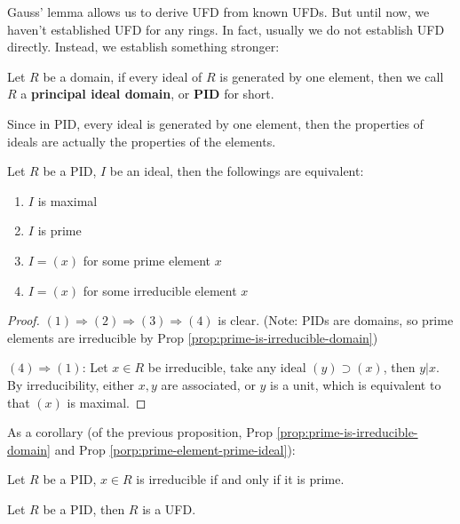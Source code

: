 \documentclass{note-eng}
\begin{document}
Gauss' lemma allows us to derive UFD from known UFDs. But until now, we haven't established UFD for any rings. In fact, usually we do not establish UFD directly. Instead, we establish something stronger:

\begin{definition} 
    Let $R$ be a domain, if every ideal of $R$ is generated by one element, then we call $R$ a \textbf{principal ideal domain}, or \textbf{PID} for short.
\end{definition}

Since in PID, every ideal is generated by one element, then the properties of ideals are actually the properties of the elements.

\begin{proposition} \label{prop:PID-ideals}
    Let $R$ be a PID, $I$ be an ideal, then the followings are equivalent:
    \begin{enumerate}
        \item $I$ is maximal
        \item $I$ is prime
        \item $I = (x)$ for some prime element $x$
        \item $I = (x)$ for some irreducible element $x$
    \end{enumerate}
\end{proposition}

\begin{proof}
    $(1) \Rightarrow (2) \Rightarrow (3) \Rightarrow (4)$ is clear. (Note: PIDs are domains, so prime elements are irreducible by Prop \ref{prop:prime-is-irreducible-domain})
    
    $(4) \Rightarrow (1)$: Let $x \in R$ be irreducible, take any ideal $(y) \supset (x)$, then $y | x$. By irreducibility, either $x, y$ are associated, or $y$ is a unit, which is equivalent to that $(x)$ is maximal.
\end{proof}

As a corollary (of the previous proposition, Prop \ref{prop:prime-is-irreducible-domain} and Prop \ref{porp:prime-element-prime-ideal}):

\begin{corollary}
    Let $R$ be a PID, $x \in R$ is irreducible if and only if it is prime.
\end{corollary}

\begin{proposition}
    Let $R$ be a PID, then $R$ is a UFD.
\end{proposition}
\end{document}
